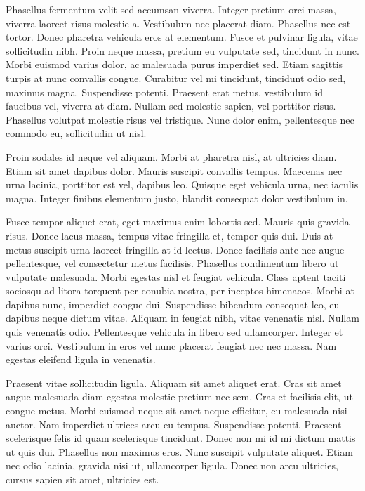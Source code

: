 Phasellus fermentum velit sed accumsan viverra. Integer pretium orci massa, viverra laoreet risus molestie a. Vestibulum nec placerat diam. Phasellus nec est tortor. Donec pharetra vehicula eros at elementum. Fusce et pulvinar ligula, vitae sollicitudin nibh. Proin neque massa, pretium eu vulputate sed, tincidunt in nunc. Morbi euismod varius dolor, ac malesuada purus imperdiet sed. Etiam sagittis turpis at nunc convallis congue. Curabitur vel mi tincidunt, tincidunt odio sed, maximus magna. Suspendisse potenti. Praesent erat metus, vestibulum id faucibus vel, viverra at diam. Nullam sed molestie sapien, vel porttitor risus. Phasellus volutpat molestie risus vel tristique. Nunc dolor enim, pellentesque nec commodo eu, sollicitudin ut nisl.

Proin sodales id neque vel aliquam. Morbi at pharetra nisl, at ultricies diam. Etiam sit amet dapibus dolor. Mauris suscipit convallis tempus. Maecenas nec urna lacinia, porttitor est vel, dapibus leo. Quisque eget vehicula urna, nec iaculis magna. Integer finibus elementum justo, blandit consequat dolor vestibulum in.

Fusce tempor aliquet erat, eget maximus enim lobortis sed. Mauris quis gravida risus. Donec lacus massa, tempus vitae fringilla et, tempor quis dui. Duis at metus suscipit urna laoreet fringilla at id lectus. Donec facilisis ante nec augue pellentesque, vel consectetur metus facilisis. Phasellus condimentum libero ut vulputate malesuada. Morbi egestas nisl et feugiat vehicula. Class aptent taciti sociosqu ad litora torquent per conubia nostra, per inceptos himenaeos. Morbi at dapibus nunc, imperdiet congue dui. Suspendisse bibendum consequat leo, eu dapibus neque dictum vitae. Aliquam in feugiat nibh, vitae venenatis nisl. Nullam quis venenatis odio. Pellentesque vehicula in libero sed ullamcorper. Integer et varius orci. Vestibulum in eros vel nunc placerat feugiat nec nec massa. Nam egestas eleifend ligula in venenatis.

Praesent vitae sollicitudin ligula. Aliquam sit amet aliquet erat. Cras sit amet augue malesuada diam egestas molestie pretium nec sem. Cras et facilisis elit, ut congue metus. Morbi euismod neque sit amet neque efficitur, eu malesuada nisi auctor. Nam imperdiet ultrices arcu eu tempus. Suspendisse potenti. Praesent scelerisque felis id quam scelerisque tincidunt. Donec non mi id mi dictum mattis ut quis dui. Phasellus non maximus eros. Nunc suscipit vulputate aliquet. Etiam nec odio lacinia, gravida nisi ut, ullamcorper ligula. Donec non arcu ultricies, cursus sapien sit amet, ultricies est.

